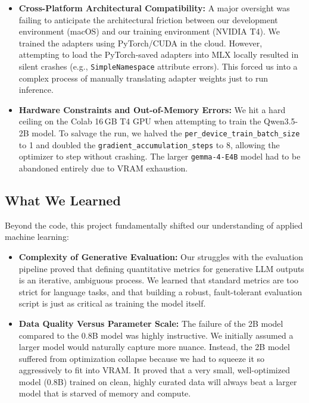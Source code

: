 \documentclass[unnumsec,webpdf,modern,large]{oup-authoring-template}%
\theoremstyle{thmstyleone}%
\theoremstyle{thmstyletwo}%
\theoremstyle{thmstylethree}%
\begin{document}
\begin{itemize}
    \item \textbf{Cross-Platform Architectural Compatibility:} A major oversight was failing to anticipate the architectural friction between our development environment (macOS) and our training environment (NVIDIA T4). We trained the adapters using PyTorch/CUDA in the cloud. However, attempting to load the PyTorch-saved adapters into MLX locally resulted in silent crashes (e.g., \texttt{SimpleNamespace} attribute errors). This forced us into a complex process of manually translating adapter weights just to run inference.
    \item \textbf{Hardware Constraints and Out-of-Memory Errors:} We hit a hard ceiling on the Colab 16\,GB T4 GPU when attempting to train the Qwen3.5-2B model. To salvage the run, we halved the \texttt{per\_device\_train\_batch\_size} to 1 and doubled the \texttt{gradient\_accumulation\_steps} to 8, allowing the optimizer to step without crashing. The larger \texttt{gemma-4-E4B} model had to be abandoned entirely due to VRAM exhaustion.
\end{itemize}

\subsection{What We Learned}
Beyond the code, this project fundamentally shifted our understanding of applied machine learning:
\begin{itemize}
    \item \textbf{Complexity of Generative Evaluation:} Our struggles with the evaluation pipeline proved that defining quantitative metrics for generative LLM outputs is an iterative, ambiguous process. We learned that standard metrics are too strict for language tasks, and that building a robust, fault-tolerant evaluation script is just as critical as training the model itself.
    \item \textbf{Data Quality Versus Parameter Scale:} The failure of the 2B model compared to the 0.8B model was highly instructive. We initially assumed a larger model would naturally capture more nuance. Instead, the 2B model suffered from optimization collapse because we had to squeeze it so aggressively to fit into VRAM. It proved that a very small, well-optimized model (0.8B) trained on clean, highly curated data will always beat a larger model that is starved of memory and compute.
\end{itemize}
\end{document}
